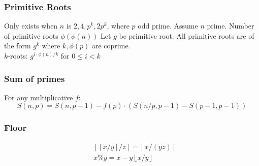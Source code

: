       \subsubsection{Primitive Roots}
        Only exists when $n$ is $2, 4, p^k, 2p^k$, where $p$ odd prime. Assume
        $n$ prime. Number of primitive roots $\phi(\phi(n))$
        Let $g$ be primitive root. All primitive roots are of the form $g^k$
        where $k,\phi(p)$ are coprime.\\ $k$-roots:
        $g^{i \cdot \phi(n) / k}$ for $0 \leq i < k$

      \subsubsection{Sum of primes} For any multiplicative $f$:
        \[
            S(n,p) = S(n, p-1) - f(p) \cdot (S(n/p,p-1) - S(p-1,p-1))
        \]

      \subsubsection{Floor}
        \begin{align*}
            &\left\lfloor \left\lfloor x/y \right\rfloor / z \right\rfloor = \left\lfloor x / (yz) \right\rfloor \\
            &x \% y = x - y \left\lfloor x / y \right\rfloor
        \end{align*}


\iffalse
  \clearpage
